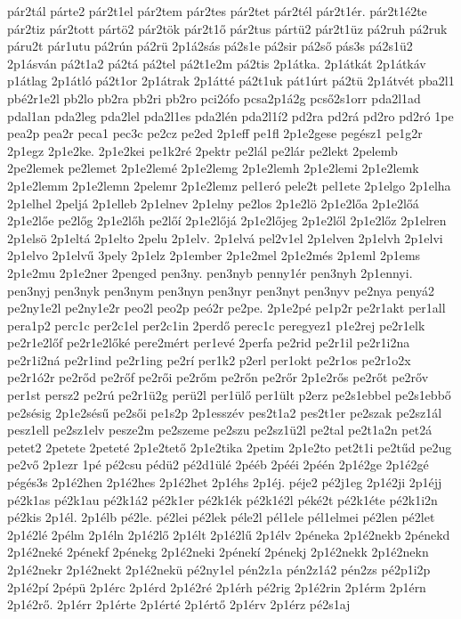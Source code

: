 {pár2tál
párte2
pár2t1el
pár2tem
pár2tes
pár2tet
pár2tél
pár2t1ér.
pár2t1é2te
pár2tiz
pár2tott
pártö2
pár2tök
pár2t1ő
pár2tus
pártü2
pár2t1üz
pá2ruh
pá2ruk
páru2t
pár1utu
pá2rún
pá2rü
2p1á2sás
pá2s1e
pá2sir
pá2ső
pás3s
pá2s1ü2
2p1ásván
pá2t1a2
pá2tá
pá2tel
pá2t1e2m
pá2tis
2p1átka.
2p1átkát
2p1átkáv
p1átlag
2p1átló
pá2t1or
2p1átrak
2p1átté
pá2t1uk
pát1úrt
pá2tü
2p1átvét
pba2l1
pbé2r1e2l
pb2lo
pb2ra
pb2ri
pb2ro
pci2ófo
pcsa2p1á2g
pcső2s1orr
pda2l1ad
pdal1an
pda2leg
pda2lel
pda2l1es
pda2lén
pda2l1í2
pd2ra
pd2rá
pd2ro
pd2ró
1pe
pea2p
pea2r
peca1
pec3c
pe2cz
pe2ed
2p1eff
pe1fl
2p1e2gese
pegész1
pe1g2r
2p1egz
2p1e2ke.
2p1e2kei
pe1k2ré
2pektr
pe2lál
pe2lár
pe2lekt
2pelemb
2pe2lemek
pe2lemet
2p1e2lemé
2p1e2lemg
2p1e2lemh
2p1e2lemi
2p1e2lemk
2p1e2lemm
2p1e2lemn
2pelemr
2p1e2lemz
pel1eró
pele2t
pel1ete
2p1elgo
2p1elha
2p1elhel
2peljá
2p1elleb
2p1elnev
2p1elny
pe2los
2p1e2lö
2p1e2lőa
2p1e2lőá
2p1e2lőe
pe2lőg
2p1e2lőh
pe2lőí
2p1e2lőjá
2p1e2lőjeg
2p1e2lől
2p1e2lőz
2p1elren
2p1elsö
2p1eltá
2p1elto
2pelu
2p1elv.
2p1elvá
pel2v1el
2p1elven
2p1elvh
2p1elvi
2p1elvo
2p1elvű
3pely
2p1elz
2p1ember
2p1e2mel
2p1e2més
2p1eml
2p1ems
2p1e2mu
2p1e2ner
2penged
pen3ny.
pen3nyb
penny1ér
pen3nyh
2p1ennyi.
pen3nyj
pen3nyk
pen3nym
pen3nyn
pen3nyr
pen3nyt
pen3nyv
pe2nya
penyá2
pe2ny1e2l
pe2ny1e2r
peo2l
peo2p
peó2r
pe2pe.
2p1e2pé
pe1p2r
pe2r1akt
per1all
pera1p2
perc1c
per2c1el
per2c1in
2perdő
perec1c
peregyez1
p1e2rej
pe2r1elk
pe2r1e2lőf
pe2r1e2lőké
pere2mért
per1evé
2perfa
pe2rid
pe2r1il
pe2r1i2na
pe2r1i2ná
pe2r1ind
pe2r1ing
pe2rí
per1k2
p2erl
per1okt
pe2r1os
pe2r1o2x
pe2r1ó2r
pe2rőd
pe2rőf
pe2rői
pe2rőm
pe2rőn
pe2rőr
2p1e2rős
pe2rőt
pe2rőv
per1st
persz2
pe2rú
pe2r1ü2g
perü2l
per1ülő
per1ült
p2erz
pe2s1ebbel
pe2s1ebbő
pe2sésig
2p1e2sésű
pe2sői
pe1s2p
2p1esszév
pes2t1a2
pes2t1er
pe2szak
pe2sz1ál
pesz1ell
pe2sz1elv
pesze2m
pe2szeme
pe2szu
pe2sz1ü2l
pe2tal
pe2t1a2n
pet2á
petet2
2petete
2peteté
2p1e2tető
2p1e2tika
2petim
2p1e2to
pet2t1i
pe2tűd
pe2ug
pe2vő
2p1ezr
1pé
pé2csu
pédü2
pé2d1ülé
2pééb
2pééi
2péén
2p1é2ge
2p1é2gé
pégés3s
2p1é2hen
2p1é2hes
2p1é2het
2p1éhs
2p1éj.
péje2
pé2j1eg
2p1é2ji
2p1éjj
pé2k1as
pé2k1au
pé2k1á2
pé2k1er
pé2k1ék
pé2k1é2l
péké2t
pé2k1éte
pé2k1i2n
pé2kis
2p1él.
2p1élb
pé2le.
pé2lei
pé2lek
péle2l
pél1ele
pél1elmei
pé2len
pé2let
2p1é2lé
2pélm
2p1éln
2p1é2lő
2p1élt
2p1é2lű
2p1élv
2péneka
2p1é2nekb
2pénekd
2p1é2neké
2pénekf
2pénekg
2p1é2neki
2pénekí
2pénekj
2p1é2nekk
2p1é2nekn
2p1é2nekr
2p1é2nekt
2p1é2nekü
pé2ny1el
pén2z1a
pén2z1á2
pén2zs
pé2p1i2p
2p1é2pí
2pépü
2p1érc
2p1érd
2p1é2ré
2p1érh
pé2rig
2p1é2rin
2p1érm
2p1érn
2p1é2rő.
2p1érr
2p1érte
2p1érté
2p1értő
2p1érv
2p1érz
pé2s1aj
}
